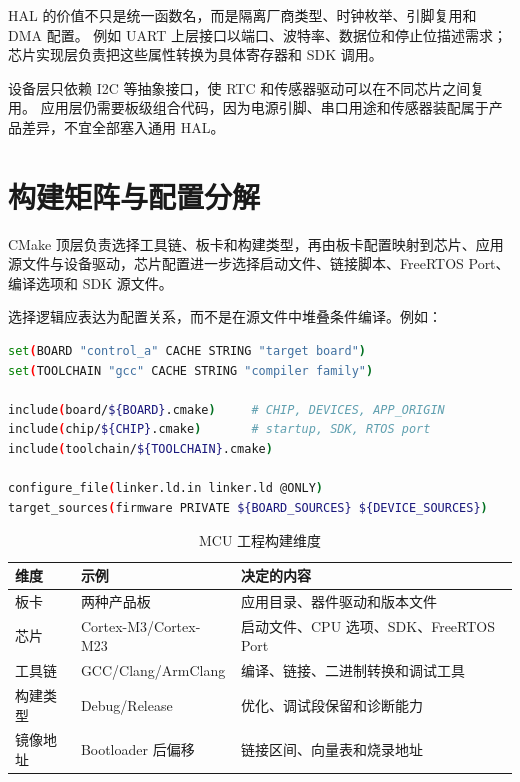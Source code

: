 HAL 的价值不只是统一函数名，而是隔离厂商类型、时钟枚举、引脚复用和 DMA 配置。
例如 UART 上层接口以端口、波特率、数据位和停止位描述需求；芯片实现层负责把这些属性转换为具体寄存器和 SDK 调用。

设备层只依赖 I2C 等抽象接口，使 RTC 和传感器驱动可以在不同芯片之间复用。
应用层仍需要板级组合代码，因为电源引脚、串口用途和传感器装配属于产品差异，不宜全部塞入通用 HAL。

\section{构建矩阵与配置分解}

CMake 顶层负责选择工具链、板卡和构建类型，再由板卡配置映射到芯片、应用源文件与设备驱动，芯片配置进一步选择启动文件、链接脚本、FreeRTOS Port、编译选项和 SDK 源文件。

选择逻辑应表达为配置关系，而不是在源文件中堆叠条件编译。例如：

\begin{lstlisting}[language=bash,caption={板卡、芯片与工具链的声明式选择（伪代码）}]
set(BOARD "control_a" CACHE STRING "target board")
set(TOOLCHAIN "gcc" CACHE STRING "compiler family")

include(board/${BOARD}.cmake)     # CHIP, DEVICES, APP_ORIGIN
include(chip/${CHIP}.cmake)       # startup, SDK, RTOS port
include(toolchain/${TOOLCHAIN}.cmake)

configure_file(linker.ld.in linker.ld @ONLY)
target_sources(firmware PRIVATE ${BOARD_SOURCES} ${DEVICE_SOURCES})
\end{lstlisting}

\begin{table}[htbp]
  \centering
  \caption{MCU 工程构建维度}
  \begin{tabular}{p{25mm}p{42mm}p{72mm}}
    \hline
    维度 & 示例 & 决定的内容 \\
    \hline
    板卡 & 两种产品板 & 应用目录、器件驱动和版本文件 \\
    芯片 & Cortex-M3/Cortex-M23 & 启动文件、CPU 选项、SDK、FreeRTOS Port \\
    工具链 & GCC/Clang/ArmClang & 编译、链接、二进制转换和调试工具 \\
    构建类型 & Debug/Release & 优化、调试段保留和诊断能力 \\
    镜像地址 & Bootloader 后偏移 & 链接区间、向量表和烧录地址 \\
    \hline
  \end{tabular}
\end{table}

